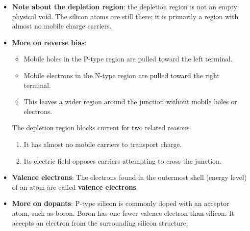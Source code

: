 \documentclass{report}
\begin{document}
\begin{itemize}
            \bigbreak \noindent 
            For example, suppose there are several chairs in a row and one chair is empty. As people move into the neighboring empty chair, the empty chair appears to move in the opposite direction. A hole behaves similarly.
            \begin{itemize}
                \item The N-type side has many mobile electrons.
                \item The P-type side has many mobile holes.
                \item The depletion region has very few of either, so it cannot conduct significant current.
            \end{itemize}
            The depletion region also contains charged dopant ions, but those ions are locked into the silicon crystal and cannot move. Therefore, they are fixed charges, not mobile carriers.
        \item \textbf{Note about the depletion region}: the depletion region is not an empty physical void. The silicon atoms are still there; it is primarily a region with almost no mobile charge carriers.
        \item \textbf{More on reverse bias}: 
            \begin{itemize}
                \item Mobile holes in the P-type region are pulled toward the left terminal.
                \item Mobile electrons in the N-type region are pulled toward the right terminal.
                \item This leaves a wider region around the junction without mobile holes or electrons.
            \end{itemize}
            The depletion region blocks current for two related reasons
            \begin{enumerate}
                \item It has almost no mobile carriers to transport charge.
                \item Its electric field opposes carriers attempting to cross the junction.
            \end{enumerate}
        \item \textbf{Valence electrons}: The electrons found in the outermost shell (energy level) of an atom are called \textbf{valence electrons}.
        \item \textbf{More on dopants}: P-type silicon is commonly doped with an acceptor atom, such as boron. Boron has one fewer valence electron than silicon. It accepts an electron from the surrounding silicon structure:

\end{itemize}
\end{document}
